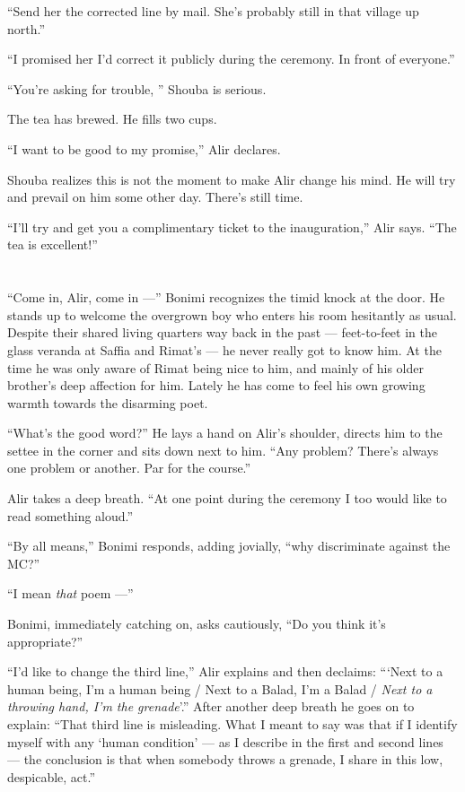 \documentclass[twoside,11pt,openany]{book}
\begin{document}
``Send her the corrected line by mail. She's probably still in that village up north.''

``I promised her I'd correct it publicly during the ceremony. In front of everyone.''

``You're asking for trouble, '' Shouba is serious.

The tea has brewed. He fills two cups.

``I want to be good to my promise,'' Alir declares.

Shouba realizes this is not the moment to make Alir change his mind. He will try and prevail on him some other day.
There's still time.

``I'll try and get you a complimentary ticket to the inauguration,'' Alir says.
``The tea is excellent!''



\chapter{}

``Come in, Alir, come in ---'' Bonimi recognizes the timid knock at the door. He stands up to
welcome the overgrown boy who enters his room hesitantly as usual. Despite their shared living quarters way back in
the past --- feet-to-feet in the glass veranda at Saffia and Rimat's --- he never really got to
know him. At the time he was only aware of Rimat being nice to him, and mainly of his older brother's deep affection
for him. Lately he has come to feel his own growing warmth towards the disarming poet.

``What's the good word?'' He lays a hand on Alir's shoulder, directs him to the settee in the
corner and sits down next to him. ``Any problem? There's always one problem or another. Par for the
course.''

Alir takes a deep breath. ``At one point during the ceremony I too would like to read something
aloud.''

``By all means,'' Bonimi responds, adding jovially,
``why discriminate against the MC?''

``I mean \textit{that} poem ---''

Bonimi, immediately catching on, asks cautiously, ``Do you think it's appropriate?''

``I'd like to change the third line,'' Alir explains and then declaims: ``{\thinspace}`Next
to a human being, I'm a human being / Next to a Balad, I'm a Balad / \textit{Next to a throwing hand, I'm the
grenade}'.'' After another deep breath he goes on to explain: ``That third line is
misleading. What I meant to say was that if I identify myself with any `human condition' --- as I describe in the first
and second lines --- the conclusion is that when somebody throws a grenade, I share in this low, despicable, act.''
\end{document}
